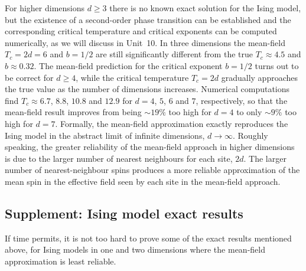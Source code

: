 For higher dimensions $d \geq 3$ there is no known exact solution for the Ising model, but the existence of a second-order phase transition can be established and the corresponding critical temperature and critical exponents can be computed numerically, as we will discuss in Unit~10.
In three dimensions the mean-field $T_c = 2d = 6$ and $b = 1 / 2$ are still significantly different from the true $T_c \approx 4.5$ and $b \approx 0.32$. %
The mean-field prediction for the critical exponent $b = 1 / 2$ turns out to be correct for $d \geq 4$, while the critical temperature $T_c = 2d$ gradually approaches the true value as the number of dimensions increases.
Numerical computations find $T_c \approx 6.7$, $8.8$, $10.8$ and $12.9$ for $d = 4$, $5$, $6$ and $7$, respectively, so that the mean-field result improves from being $\sim$$19\%$ too high for $d = 4$ to only $\sim$$9\%$ too high for $d = 7$. %
Formally, the mean-field approximation exactly reproduces the Ising model in the abstract limit of infinite dimensions, $d \to \infty$.
Roughly speaking, the greater reliability of the mean-field approach in higher dimensions is due to the larger number of nearest neighbours for each site, $2d$.
The larger number of nearest-neighbour spins produces a more reliable approximation of the mean spin in the effective field seen by each site in the mean-field approach.



\subsection{Supplement: Ising model exact results}
If time permits, it is not too hard to prove some of the exact results mentioned above, for Ising models in one and two dimensions where the mean-field approximation is least reliable.

